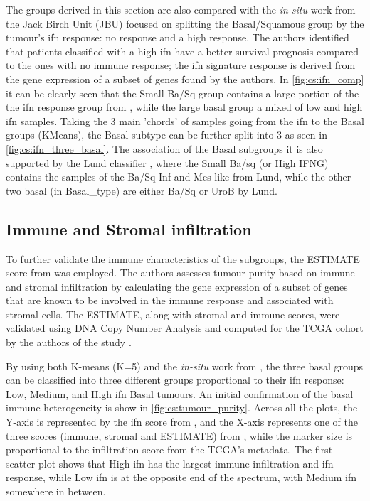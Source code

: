 The groups derived in this section are also compared with the \textit{in-situ} work \citet{Baker2022-bj} from the Jack Birch Unit (JBU) focused on splitting the Basal/Squamous group by the tumour's \acrfull{ifn} response: no response and a high response. The authors identified that patients classified with a high \acrshort{ifn} have a better survival prognosis compared to the ones with no immune response; the \acrshort{ifn} signature response is derived from the gene expression of a subset of genes found by the authors. In \cref{fig:cs:ifn_comp} it can be clearly seen that the Small Ba/Sq group contains a large portion of the the \acrshort{ifn} response group from \citet{Baker2022-bj}, while the large basal group a mixed of low and high \acrshort{ifn} samples. Taking the 3 main 'chords' of samples going from the \acrshort{ifn} to the Basal groups (KMeans), the Basal subtype can be further split into 3 as seen in \cref{fig:cs:ifn_three_basal}. The association of the Basal subgroups it is also supported by the Lund classifier \citet{Marzouka2018-ge}, where the Small Ba/sq (or High IFNG) contains the samples of the Ba/Sq-Inf and Mes-like from Lund, while the other two basal (in Basal\_type) are either Ba/Sq or UroB by Lund.

\subsection{Immune and Stromal infiltration}

To further validate the immune characteristics of the subgroups, the ESTIMATE score from \citet{Yoshihara2013-wq} was employed. The authors assesses tumour purity based on immune and stromal infiltration by calculating the gene expression of a subset of genes that are known to be involved in the immune response and associated with stromal cells. The ESTIMATE, along with stromal and immune scores, were validated using DNA Copy Number Analysis and computed for the TCGA cohort by the authors of the study \citet{Yoshihara2013-wq}.

By using both K-means (K=5) and the \textit{in-situ} work from \citet{Baker2022-bj}, the three basal groups can be classified into three different groups proportional to their \acrfull{ifn} response: Low, Medium, and High \acrshort{ifn} Basal tumours. An initial confirmation of the basal immune heterogeneity is show in \cref{fig:cs:tumour_purity}. Across all the plots, the Y-axis is represented by the \acrshort{ifn} score from \citet{Baker2022-bj}, and the X-axis represents one of the three scores (immune, stromal and ESTIMATE) from \citet{Yoshihara2013-wq}, while the marker size is proportional to the infiltration score from the TCGA's metadata. The first scatter plot shows that High \acrshort{ifn} has the largest immune infiltration and \acrshort{ifn} response, while Low \acrshort{ifn} is at the opposite end of the spectrum, with Medium \acrshort{ifn} somewhere in between.

